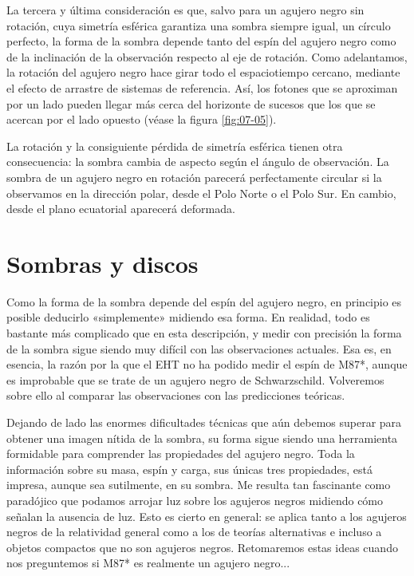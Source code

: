 La tercera y última consideración es que, salvo para un agujero negro sin rotación, cuya simetría esférica garantiza una sombra siempre igual, un círculo perfecto, la forma de la sombra depende tanto del espín del agujero negro como de la inclinación de la observación respecto al eje de rotación. Como adelantamos, la rotación del agujero negro hace girar todo el espaciotiempo cercano, mediante el efecto de arrastre de sistemas de referencia. Así, los fotones que se aproximan por un lado pueden llegar más cerca del horizonte de sucesos que los que se acercan por el lado opuesto (véase la figura \ref{fig:07-05}).

La rotación y la consiguiente pérdida de simetría esférica tienen otra consecuencia: la sombra cambia de aspecto según el ángulo de observación. La sombra de un agujero negro en rotación parecerá perfectamente circular si la observamos en la dirección polar, desde el Polo Norte o el Polo Sur. En cambio, desde el plano ecuatorial aparecerá deformada.

\section{Sombras y discos}\label{sec:07-discs}

Como la forma de la sombra depende del espín del agujero negro, en principio es posible deducirlo «simplemente» midiendo esa forma. En realidad, todo es bastante más complicado que en esta descripción, y medir con precisión la forma de la sombra sigue siendo muy difícil con las observaciones actuales. Esa es, en esencia, la razón por la que el EHT no ha podido medir el espín de M87*, aunque es improbable que se trate de un agujero negro de Schwarzschild. Volveremos sobre ello al comparar las observaciones con las predicciones teóricas.

Dejando de lado las enormes dificultades técnicas que aún debemos superar para obtener una imagen nítida de la sombra, su forma sigue siendo una herramienta formidable para comprender las propiedades del agujero negro. Toda la información sobre su masa, espín y carga, sus únicas tres propiedades, está impresa, aunque sea sutilmente, en su sombra. Me resulta tan fascinante como paradójico que podamos arrojar luz sobre los agujeros negros midiendo cómo señalan la ausencia de luz. Esto es cierto en general: se aplica tanto a los agujeros negros de la relatividad general como a los de teorías alternativas e incluso a objetos compactos que no son agujeros negros. Retomaremos estas ideas cuando nos preguntemos si M87* es realmente un agujero negro...

